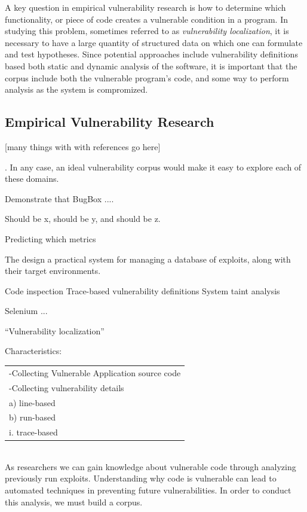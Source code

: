 \documentclass[letterpaper,twocolumn,10pt]{article}
\begin{document}
A key question in empirical vulnerability research is how to determine which functionality, or piece of code creates a vulnerable condition in a program. In studying this problem, sometimes referred to as \emph{vulnerability localization}, it is necessary to have a large quantity of structured data on which one can formulate and test hypotheses. Since potential approaches include vulnerability definitions based both static and dynamic analysis of the software, it is important that the corpus include both the vulnerable program's code, and some way to perform analysis as the system is compromized.\\

\subsection{Empirical Vulnerability Research}

[many things with with references go here]


. In any case, an ideal vulnerability corpus would make it easy to explore each of these domains. 

Demonstrate that BugBox ....

Should be x, should be y, and should be z.

 Predicting which metrics  

The design a practical system for managing a database of exploits, along with their target environments. 

Code inspection
Trace-based vulnerability definitions
System taint analysis

Selenium ... 


``Vulnerability localization''

Characteristics:\\
 \begin{tabular} { l }
   -Collecting Vulnerable Application source code\\
   -Collecting vulnerability details\\
     a) line-based\\
     b) run-based\\
      i. trace-based\\
 \end{tabular}\\

As researchers we can gain knowledge about vulnerable code through analyzing previously run exploits.  Understanding why code is vulnerable can lead to automated techniques in preventing future vulnerabilities.  In order to conduct this analysis, we must build a corpus.  
\end{document}
